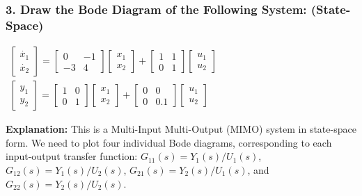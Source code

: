 \documentclass[a4paper,12pt]{article}
\begin{document}
	\subsubsection*{3. Draw the Bode Diagram of the Following System: (State-Space)}
	$\begin{array}{l} \begin{bmatrix} \dot{x_1} \\ \dot{x_2} \end{bmatrix} = \begin{bmatrix} 0 & -1 \\ -3 & 4 \end{bmatrix} \begin{bmatrix} x_1 \\ x_2 \end{bmatrix} + \begin{bmatrix} 1 & 1 \\ 0 & 1 \end{bmatrix} \begin{bmatrix} u_1 \\ u_2 \end{bmatrix} \\ \begin{bmatrix} y_1 \\ y_2 \end{bmatrix} = \begin{bmatrix} 1 & 0 \\ 0 & 1 \end{bmatrix} \begin{bmatrix} x_1 \\ x_2 \end{bmatrix} + \begin{bmatrix} 0 & 0 \\ 0 & 0.1 \end{bmatrix} \begin{bmatrix} u_1 \\ u_2 \end{bmatrix} \end{array}$
	
	\textbf{Explanation:}
	This is a Multi-Input Multi-Output (MIMO) system in state-space form. We need to plot four individual Bode diagrams, corresponding to each input-output transfer function: $G_{11}(s) = Y_1(s)/U_1(s)$, $G_{12}(s) = Y_1(s)/U_2(s)$, $G_{21}(s) = Y_2(s)/U_1(s)$, and $G_{22}(s) = Y_2(s)/U_2(s)$.
	
\end{document}
